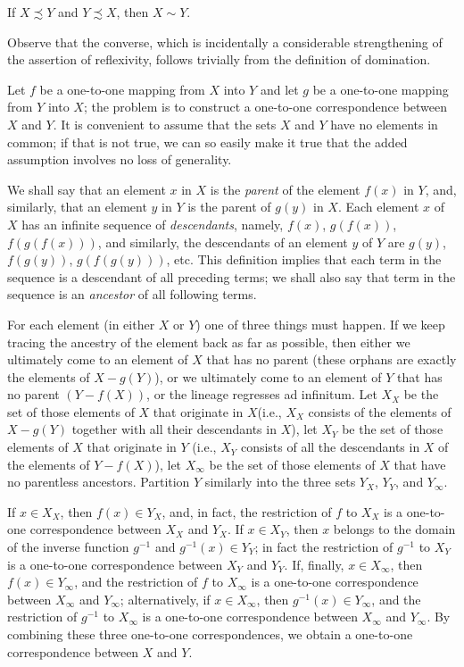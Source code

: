 \begin{named} If $X \precsim Y$ and $Y \precsim X$, then $X \sim Y$.
\end{named}

\subtitle{Remark} Observe that the converse, which is incidentally a considerable strengthening of the assertion of reflexivity, follows trivially from the definition of domination. 

\subtitle{Proof} Let $f$ be a one-to-one mapping from $X$ into $Y$ and let $g$ be a one-to-one mapping from $Y$ into $X$; the problem is to construct a one-to-one correspondence between $X$ and $Y$. It is convenient to assume that the sets $X$ and $Y$ have no elements in common; if that is not true, we can so easily make it true that the added assumption  involves no loss of generality. 

We shall say that an element $x$ in $X$ is the \textit{parent} of the element $f(x)$ in $Y$, and, similarly, that an element $y$ in $Y$ is the parent of $g(y)$ in $X$. Each element $x$ of $X$ has an infinite sequence of \textit{descendants}, namely, $f(x)$, $g(f(x))$, $f(g(f(x)))$, and similarly, the descendants of an element $y$ of $Y$ are $g(y)$, $f(g(y))$, $g(f(g(y)))$, etc. This definition implies that each term in the sequence is a descendant of all preceding terms; we shall also say that term in the sequence is an \textit{ancestor} of all following terms. 

For each element (in either $X$ or $Y$) one of three things must happen. If we keep tracing the ancestry of the element back as far as possible, then either we ultimately come to an element of $X$ that has no parent (these orphans are exactly the elements of $X - g(Y)$), or we ultimately come to an element of $Y$ that has no parent $(Y - f(X))$, or the lineage regresses ad infinitum. Let $X_{X}$ be the set of those elements of $X$ that originate in $X$(i.e., $X_{X}$ consists of the elements of $X - g(Y)$ together with all their descendants in $X$), let $X_{Y}$ be the set of those elements of $X$ that originate in $Y$ (i.e., $X_{Y}$ consists of all the descendants in $X$ of the elements of $Y - f(X)$), let $X_{\infty}$ be the set of those elements of $X$ that have no parentless ancestors. Partition $Y$ similarly into the three sets $Y_{X}$, $Y_{Y}$, and $Y_{\infty}$. 

If $x \in X_{X}$, then $f(x) \in Y_{X}$, and, in fact, the restriction of $f$ to $X_{X}$ is a one-to-one correspondence between $X_{X}$ and $Y_{X}$. If $x \in X_{Y}$, then $x$ belongs to the domain of the inverse function $g^{-1}$ and $g^{-1}(x) \in Y_{Y}$; in fact the restriction of $g^{-1}$ to $X_{Y}$ is a one-to-one correspondence between $X_{Y}$ and $Y_{Y}$. If, finally, $x \in X_{\infty}$, then $f(x) \in Y_{\infty}$, and the restriction of $f$ to $X_{\infty}$ is a one-to-one correspondence between $X_{\infty}$ and  $Y_{\infty}$; alternatively, if $x \in X_{\infty}$, then $g^{-1}(x) \in Y_{\infty}$, and the restriction of $g^{-1}$ to $X_{\infty}$ is a one-to-one correspondence between $X_{\infty}$ and $Y_{\infty}$. By combining these three one-to-one correspondences, we obtain a one-to-one correspondence between $X$ and $Y$. 


